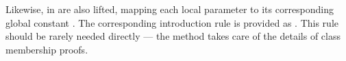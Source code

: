 \begin{isabellebody}
\begin{isamarkuptext}
\begin{description}
  Likewise, \hyperlink{element.assumes}{\mbox{}} in  are also lifted,
  mapping each local parameter  to its
  corresponding global constant .  The
  corresponding introduction rule is provided as .  This rule should be rarely needed directly
  --- the \hyperlink{method.intro-classes}{\mbox{}} method takes care of the details of
  class membership proofs.


\end{description}
\end{isamarkuptext}
\end{isabellebody}

